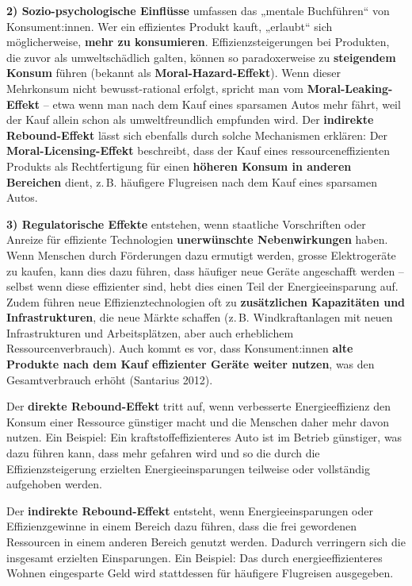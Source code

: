 \documentclass[
  letterpaper,
  DIV=11,
  numbers=noendperiod]{scrartcl}
\begin{document}
\textbf{2) Sozio-psychologische Einflüsse} umfassen das „mentale
Buchführen`` von Konsument:innen. Wer ein effizientes Produkt kauft,
„erlaubt`` sich möglicherweise, \textbf{mehr zu konsumieren}.
Effizienzsteigerungen bei Produkten, die zuvor als umweltschädlich
galten, können so paradoxerweise zu \textbf{steigendem Konsum} führen
(bekannt als \textbf{Moral-Hazard-Effekt}). Wenn dieser Mehrkonsum nicht
bewusst-rational erfolgt, spricht man vom \textbf{Moral-Leaking-Effekt}
-- etwa wenn man nach dem Kauf eines sparsamen Autos mehr fährt, weil
der Kauf allein schon als umweltfreundlich empfunden wird. Der
\textbf{indirekte Rebound-Effekt} lässt sich ebenfalls durch solche
Mechanismen erklären: Der \textbf{Moral-Licensing-Effekt} beschreibt,
dass der Kauf eines ressourceneffizienten Produkts als Rechtfertigung
für einen \textbf{höheren Konsum in anderen Bereichen} dient, z.\,B.
häufigere Flugreisen nach dem Kauf eines sparsamen Autos.

\textbf{3) Regulatorische Effekte} entstehen, wenn staatliche
Vorschriften oder Anreize für effiziente Technologien
\textbf{unerwünschte Nebenwirkungen} haben. Wenn Menschen durch
Förderungen dazu ermutigt werden, grosse Elektrogeräte zu kaufen, kann
dies dazu führen, dass häufiger neue Geräte angeschafft werden -- selbst
wenn diese effizienter sind, hebt dies einen Teil der Energieeinsparung
auf. Zudem führen neue Effizienztechnologien oft zu \textbf{zusätzlichen
Kapazitäten und Infrastrukturen}, die neue Märkte schaffen (z.\,B.
Windkraftanlagen mit neuen Infrastrukturen und Arbeitsplätzen, aber auch
erheblichem Ressourcenverbrauch). Auch kommt es vor, dass
Konsument:innen \textbf{alte Produkte nach dem Kauf effizienter Geräte
weiter nutzen}, was den Gesamtverbrauch erhöht (Santarius 2012).

\begin{tcolorbox}[enhanced jigsaw, opacitybacktitle=0.6, breakable, left=2mm, colback=white, leftrule=.75mm, colbacktitle=quarto-callout-note-color!10!white, bottomrule=.15mm, toprule=.15mm, titlerule=0mm, title=\textcolor{quarto-callout-note-color}{\faInfo}\hspace{0.5em}{Rebound-Effekte}, colframe=quarto-callout-note-color-frame, bottomtitle=1mm, opacityback=0, arc=.35mm, toptitle=1mm, rightrule=.15mm, coltitle=black]

Der \textbf{direkte Rebound-Effekt} tritt auf, wenn verbesserte
Energieeffizienz den Konsum einer Ressource günstiger macht und die
Menschen daher mehr davon nutzen. Ein Beispiel: Ein
kraftstoffeffizienteres Auto ist im Betrieb günstiger, was dazu führen
kann, dass mehr gefahren wird und so die durch die Effizienzsteigerung
erzielten Energieeinsparungen teilweise oder vollständig aufgehoben
werden.

Der \textbf{indirekte Rebound-Effekt} entsteht, wenn Energieeinsparungen
oder Effizienzgewinne in einem Bereich dazu führen, dass die frei
gewordenen Ressourcen in einem anderen Bereich genutzt werden. Dadurch
verringern sich die insgesamt erzielten Einsparungen. Ein Beispiel: Das
durch energieeffizienteres Wohnen eingesparte Geld wird stattdessen für
häufigere Flugreisen ausgegeben.

\end{tcolorbox}
\end{document}
